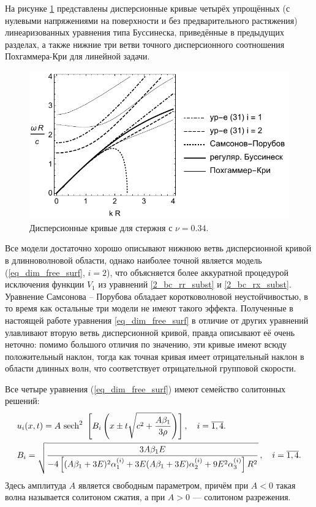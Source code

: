 \documentclass[12pt, a4paper]{article}
\begin{document}
На рисунке \ref{fig:disp} представлены дисперсионные кривые четырёх упрощённых (с нулевыми напряжениями на поверхности и без предварительного растяжения) линеаризованных уравнения типа Буссинеска, приведённые в предыдущих разделах, а также нижние три ветви точного дисперсионного соотношения Похгаммера-Кри для линейной задачи.
\begin{figure}[h]
	\centering
	\includegraphics[width=0.65\linewidth]{2_DispBlackSmall}
	\caption{Дисперсионные кривые для стержня с $\nu = 0.34$.}
	\label{fig:disp}
	\vspace{-2mm}
\end{figure} 

Все модели достаточно хорошо описывают нижнюю ветвь дисперсионной кривой в длинноволновой области, однако наиболее точной является модель (\ref{eq_dim_free_surf}, $i=2$), что объясняется более аккуратной процедурой исключения функции $V_1$ из уравнений \eqref{2_bc_rr_subst} и \eqref{2_bc_rx_subst}. Уравнение Самсонова -- Порубова обладает коротковолновой неустойчивостью, в то время как остальные три модели не имеют такого эффекта. 
Полученные в настоящей работе уравнения \eqref{eq_dim_free_surf} в отличие от других уравнений улавливают вторую ветвь дисперсионной кривой, правда описывают её очень неточно: помимо большого отличия по значению, эти кривые имеют всюду положительный наклон, тогда как точная кривая имеет отрицательный наклон в области длинных волн, что соответствует отрицательной групповой скорости.

Все четыре уравнения (\ref{eq_dim_free_surf}) имеют семейство солитонных решений:
\begin{align}
\label{soliton}
&u_i(x,t) = A\ {\rm sech}^2\ \left[B_{i} \left(x\pm t \sqrt{c^2+\frac{A \beta_1}{3 \rho}}\right) \right], \quad i = \overline {1,4}.\\
&B_i = \sqrt{\frac{3A\beta_1 E}{-4\left[(A\beta_1 + 3E)^2\alpha_1^{(i)} + 3E(A\beta_1 + 3E)\alpha_2^{(i)} + 9E^2\alpha_3^{(i)}\right] R^2}} \, , \quad i = \overline {1,4}.
\end{align}
Здесь амплитуда $A$ является свободным параметром, причём при $A<0$ такая волна называется солитоном сжатия, а при $A>0$ --- солитоном разрежения.
\end{document}
